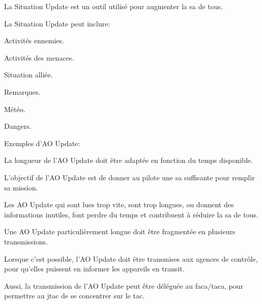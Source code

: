 \begin{e1}
	
	\begin{e2}
		\item La Situation Update est un outil utilisé pour augmenter la \gls{sa} de tous.
		
		La Situation Update peut inclure:
		
		\begin{e3}
			
			\item Activités ennemies.
			\item Activités des menaces.
			\item Situation alliée.
			\item Remarques.
			\item Météo.
			\item Dangers.
			
		\end{e3}
		
		\item Exemples d'AO Update:
		
		
		
		\begin{e3}
			\item La longueur de l'AO Update doit être adaptée en fonction du temps disponible.
			
			L'objectif de l'AO Update est de donner au pilote une \gls{sa} suffisante pour remplir sa mission.
			
			Les AO Update qui sont lues trop vite, sont trop longues, ou donnent des informations inutiles, font perdre du temps et contribuent à réduire la \gls{sa} de tous.
			
			Une AO Update particulièrement longue doit être fragmentée en plusieurs transmissions.
			
			\item Lorsque c'est possible, l'AO Update doit être transmises aux agences de contrôle, pour qu'elles puissent en informer les appareils en transit.
			
			Aussi, la transmission de l'AO Update peut être déléguée au \gls{faca}/\gls{taca}, pour permettre au \gls{jtac} de se concentrer sur le \gls{tac}.
			
			

\end{e3}
\end{e2}
\end{e1}
